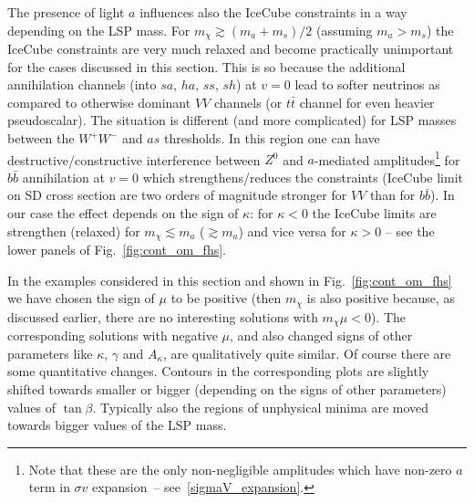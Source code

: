\documentclass[12pt,twoside]{article}
\begin{document}
The presence of light $a$ influences also the IceCube constraints 
in a way depending on the LSP mass. For $m_\chi\gtrsim(m_a+m_s)/2$ 
(assuming $m_a>m_s$) the IceCube constraints are very much relaxed 
and become practically unimportant for the cases discussed in this section. 
This is so because the additional annihilation channels 
(into $sa$, $ha$, $ss$, $sh$) at $v=0$ lead to softer 
neutrinos as compared to otherwise dominant $VV$ channels
(or $t\bar{t}$ channel for even heavier pseudoscalar). 
The situation is different (and more complicated) for LSP masses 
between the $W^+W^-$ and $as$ thresholds. In this region  
one can have destructive/constructive interference between $Z^0$ and $a$-mediated 
amplitudes\footnote{
Note that these are the only non-negligible amplitudes which have non-zero 
$a$ term in $\sigma v$ expansion~-- see~\eqref{sigmaV_expansion}.
} 
for $b\bar{b}$ annihilation at $v=0$ which strengthens/reduces the constraints 
(IceCube limit on SD cross section are two orders of magnitude stronger 
for $VV$ than for $b\bar{b}$). In our case the effect depends on the sign of $\kappa$: 
for $\kappa<0$ the IceCube limits are strengthen (relaxed) for $m_\chi\lesssim m_a$ ($\gtrsim m_a$) and vice versa for $\kappa>0$
-- see the lower panels of Fig.~\ref{fig:cont_om_fhs}. 


In the examples considered in this section and shown in 
Fig.~\ref{fig:cont_om_fhs} we have chosen the sign of $\mu$ to be positive 
(then $m_\chi$ is also positive because, as discussed earlier, 
there are no interesting solutions with $m_\chi\mu<0$). The corresponding 
solutions with negative $\mu$, and also changed signs of other parameters 
like $\kappa$, $\gamma$ and $A_\kappa$, are qualitatively quite similar. 
Of course there are some quantitative changes. Contours in the corresponding 
plots are slightly shifted towards smaller or bigger 
(depending on the signs of other parameters) values of $\tan\beta$. 
Typically also the regions of unphysical minima are moved towards 
bigger values of the LSP mass. 
\end{document}
